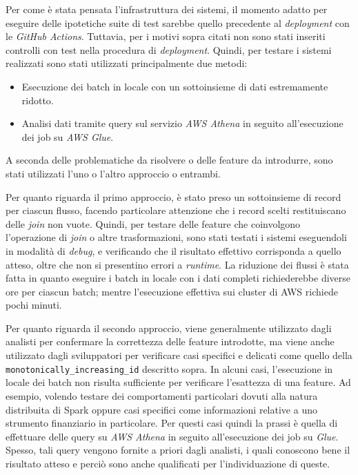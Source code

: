 Per come è stata pensata l'infrastruttura dei sistemi, il momento adatto per eseguire delle ipotetiche suite di test sarebbe quello precedente al \textit{deployment} con le \textit{GitHub Actions}.
Tuttavia, per i motivi sopra citati non sono stati inseriti controlli con test nella procedura di \textit{deployment}.
Quindi, per testare i sistemi realizzati sono stati utilizzati principalmente due metodi:
\begin{itemize}
    \item Esecuzione dei batch in locale con un sottoinsieme di dati estremamente ridotto.
    \item Analisi dati tramite query sul servizio \textit{AWS Athena} in seguito all'esecuzione dei job su \textit{AWS Glue}.
\end{itemize}
A seconda delle problematiche da risolvere o delle feature da introdurre, sono stati utilizzati l'uno o l'altro approccio o entrambi.

Per quanto riguarda il primo approccio, è stato preso un sottoinsieme di record per ciascun flusso, facendo particolare attenzione che i record scelti restituiscano delle \textit{join} non vuote.
Quindi, per testare delle feature che coinvolgono l'operazione di \textit{join} o altre trasformazioni, sono stati testati i sistemi eseguendoli in modalità di \textit{debug}, e verificando che il risultato effettivo corrisponda a quello atteso, oltre che non si presentino errori a \textit{runtime}.
La riduzione dei flussi è stata fatta in quanto eseguire i batch in locale con i dati completi richiederebbe diverse ore per ciascun batch;
mentre l'esecuzione effettiva sui cluster di AWS richiede pochi minuti.

Per quanto riguarda il secondo approccio, viene generalmente utilizzato dagli analisti per confermare la correttezza delle feature introdotte, ma viene anche utilizzato dagli sviluppatori per verificare casi specifici e delicati come quello della \texttt{monotonically\_increasing\_id} descritto sopra.
In alcuni casi, l'esecuzione in locale dei batch non risulta sufficiente per verificare l'esattezza di una feature.
Ad esempio, volendo testare dei comportamenti particolari dovuti alla natura distribuita di Spark oppure casi specifici come informazioni relative a uno strumento finanziario in particolare.
Per questi casi quindi la prassi è quella di effettuare delle query su \textit{AWS Athena} in seguito all'esecuzione dei job su \textit{Glue}.
Spesso, tali query vengono fornite a priori dagli analisti, i quali conoscono bene il risultato atteso e perciò sono anche qualificati per l'individuazione di queste.

